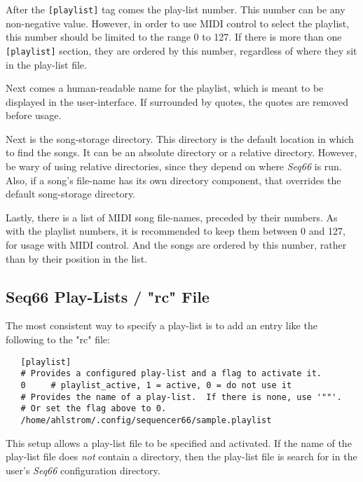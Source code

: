   After the \texttt{[playlist]} tag comes the play-list number.
   This number can be any non-negative value.
   However, in order to use MIDI control to select the playlist, this number
   should be limited to the range 0 to 127.
   If there is more than one \texttt{[playlist]} section, they are ordered by
   this number, regardless of where they sit in the play-list file.

   Next comes a human-readable name for the playlist, which is meant to be
   displayed in the user-interface.  If surrounded by quotes, the quotes are
   removed before usage.

   Next is the song-storage directory.
   This directory is the default location in which to find the songs.
   It can be an absolute directory or a relative directory.
   However, be wary of using relative directories, since they depend on where
   \textsl{Seq66} is run.
   Also, if a song's file-name  has its own directory component, that overrides
   the default song-storage directory.

   Lastly, there is a list of MIDI song file-names, preceded by their numbers.
   As with the playlist numbers, it is recommended to keep them between 0 and
   127, for usage with MIDI control.  And the songs are ordered by this number,
   rather than by their position in the list.

\subsection{Seq66 Play-Lists / "rc" File}
\label{subsec:playlist_rc_file}

   The most consistent way to specify a play-list is to add an entry like the
   following to the "rc" file:

   \begin{verbatim}
   [playlist]
   # Provides a configured play-list and a flag to activate it.
   0     # playlist_active, 1 = active, 0 = do not use it
   # Provides the name of a play-list.  If there is none, use '""'.
   # Or set the flag above to 0.
   /home/ahlstrom/.config/sequencer66/sample.playlist
   \end{verbatim}

   This setup allows a play-list file to be specified and activated.
   If the name of the play-list file does \textsl{not} contain a directory,
   then the play-list file is search for in the user's \textsl{Seq66}
   configuration directory.

